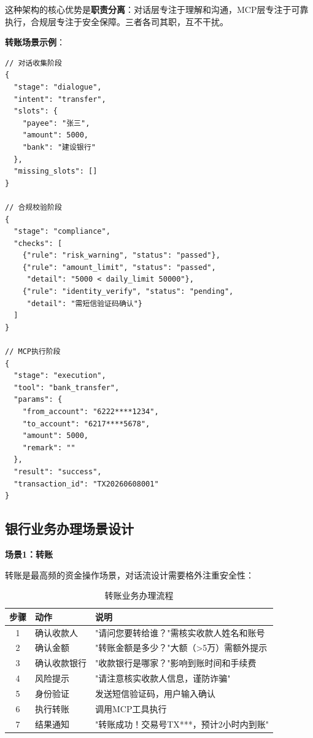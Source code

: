 这种架构的核心优势是\textbf{职责分离}：对话层专注于理解和沟通，MCP层专注于可靠执行，合规层专注于安全保障。三者各司其职，互不干扰。

\textbf{转账场景示例}：

\begin{lstlisting}[style=json]
// 对话收集阶段
{
  "stage": "dialogue",
  "intent": "transfer",
  "slots": {
    "payee": "张三",
    "amount": 5000,
    "bank": "建设银行"
  },
  "missing_slots": []
}

// 合规校验阶段
{
  "stage": "compliance",
  "checks": [
    {"rule": "risk_warning", "status": "passed"},
    {"rule": "amount_limit", "status": "passed",
     "detail": "5000 < daily_limit 50000"},
    {"rule": "identity_verify", "status": "pending",
     "detail": "需短信验证码确认"}
  ]
}

// MCP执行阶段
{
  "stage": "execution",
  "tool": "bank_transfer",
  "params": {
    "from_account": "6222****1234",
    "to_account": "6217****5678",
    "amount": 5000,
    "remark": ""
  },
  "result": "success",
  "transaction_id": "TX20260608001"
}
\end{lstlisting}

\subsection{银行业务办理场景设计}

\textbf{场景1：转账}

转账是最高频的资金操作场景，对话流设计需要格外注重安全性：

\begin{table}[H]
\centering
\small
\begin{tabular}{clp{6cm}}
\toprule
\textbf{步骤} & \textbf{动作} & \textbf{说明} \\
\midrule
1 & 确认收款人 & "请问您要转给谁？"需核实收款人姓名和账号 \\
2 & 确认金额 & "转账金额是多少？"大额（>5万）需额外提示 \\
3 & 确认收款银行 & "收款银行是哪家？"影响到账时间和手续费 \\
4 & 风险提示 & "请注意核实收款人信息，谨防诈骗" \\
5 & 身份验证 & 发送短信验证码，用户输入确认 \\
6 & 执行转账 & 调用MCP工具执行 \\
7 & 结果通知 & "转账成功！交易号TX***，预计2小时内到账" \\
\bottomrule
\end{tabular}
\caption{转账业务办理流程}
\end{table}

